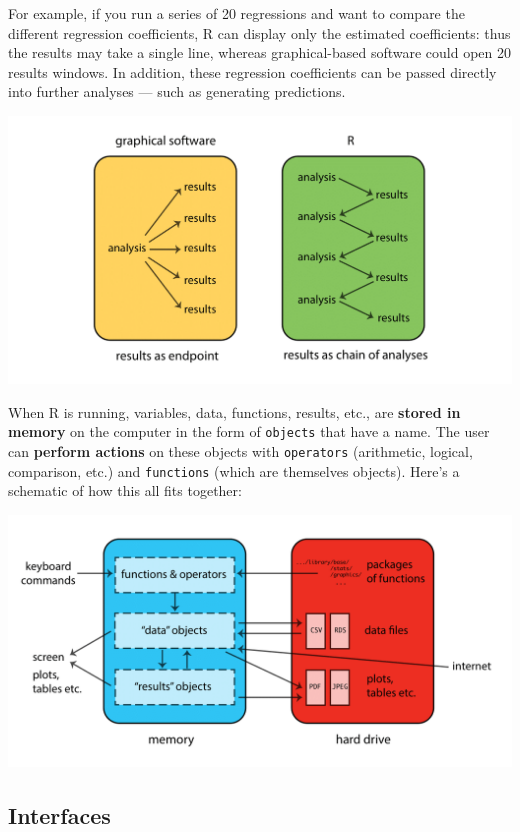 \documentclass[
]{book}
\begin{document}
For example, if you run a series of 20 regressions and want to compare the
different regression coefficients, R can display only the estimated coefficients:
thus the results may take a single line, whereas graphical-based software could
open 20 results windows. In addition, these regression coefficients can be passed
directly into further analyses --- such as generating predictions.

\includegraphics{R/Rintro/images/R_chain.png}

When R is running, variables, data, functions, results, etc., are \textbf{stored in memory}
on the computer in the form of \texttt{objects} that have a name. The user can
\textbf{perform actions} on these objects with \texttt{operators} (arithmetic, logical,
comparison, etc.) and \texttt{functions} (which are themselves objects). Here's a
schematic of how this all fits together:

\includegraphics{R/Rintro/images/R_works.png}

\hypertarget{interfaces}{%
\subsection{Interfaces}\label{interfaces}}
\end{document}
